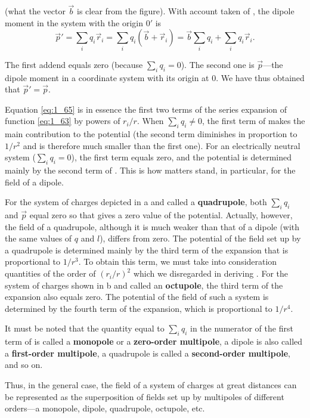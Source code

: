 \noindent
(what the vector $\vec{b}$ is clear from the figure). With account taken of , the dipole moment in the system with the origin $0'$ is
\begin{equation*}
	\vec{p}' = \sum_i q_i \vec{r}_i = \sum_i q_i (\vec{b} + \vec{r}_i) = \vec{b} \sum_i q_i + \sum_i q_i \vec{r}_i.
\end{equation*}

\noindent
The first addend equals zero (because $\sum_iq_i=0$). The second one is $\vec{p}$---the dipole moment in a coordinate system with its origin at $0$. We have thus obtained that $\vec{p}'=\vec{p}$.

Equation \eqref{eq:1_65} is in essence the first two terms of the series expansion of function \eqref{eq:1_63} by powers of $r_i/r$. When $\sum_iq_i\neq 0$, the first term of  makes the main contribution to the potential (the second term diminishes in proportion to $1/r^2$ and is therefore much smaller than the first one). For an electrically neutral system ($\sum_iq_i=0$), the first term equals zero, and the potential is determined mainly by the second term of . This is how matters stand, in particular, for the field of a dipole.

For the system of charges depicted in a and called a \textbf{quadrupole}, both $\sum_iq_i$ and $\vec{p}$ equal zero so that  gives a zero value of the potential. Actually, however, the field of a quadrupole, although it is much weaker than that of a dipole (with the same values of $q$ and $l$), differs from zero. The potential of the field set up by a quadrupole is determined mainly by the third term of the expansion that is proportional to $1/r^3$. To obtain this term, we must take into consideration quantities of the order of $(r_i/r)^2$ which we disregarded in deriving . For the system of charges shown in b and called an \textbf{octupole}, the third term of the expansion also equals zero. The potential of the field of such a system is determined by the fourth term of the expansion, which is proportional to $1/r^4$.

It must be noted that the quantity equal to $\sum_iq_i$ in the numerator of the first term of  is called a \textbf{monopole} or a \textbf{zero-order multipole}, a dipole is also called a \textbf{first-order multipole}, a quadrupole is called a \textbf{second-order multipole}, and so on.

Thus, in the general case, the field of a system of charges at great distances can be represented as the superposition of fields set up by multipoles of different orders---a monopole, dipole, quadrupole, octupole, etc.

